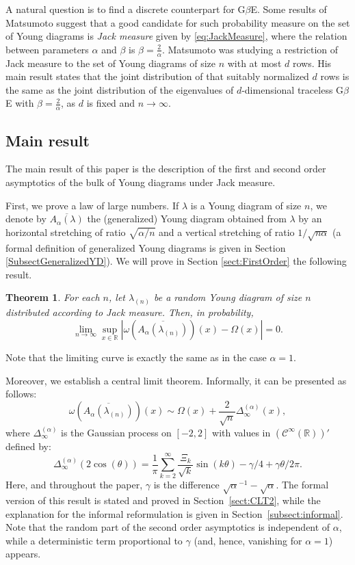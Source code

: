\documentclass[11pt]{amsart}
\theoremstyle{plain}
\newtheorem{theorem}[lemma]{Theorem}
\theoremstyle{remark}
\newcommand{\RR}{\mathbb{R}}
\begin{document}
A natural question is to find a discrete counterpart for G$\beta$E.
Some results of Matsumoto \cite{MatsumotoJackPlancherelFewRows} suggest that
a good candidate for such probability measure on the set of Young diagrams is \emph{Jack measure} given by \eqref{eq:JackMeasure},
where the relation between parameters $\alpha$ and $\beta$ is $\beta = \frac{2}{\alpha}$.
 Matsumoto was studying a restriction of Jack measure to the set of Young diagrams of size $n$ with at most $d$ rows.
 His main result states that the joint distribution of that suitably normalized $d$ rows 
 is the same as the joint distribution of the eigenvalues of $d$-dimensional traceless G$\beta$E with $\beta = \frac{2}{\alpha}$, 
 as $d$ is fixed and $n \to \infty$.

\subsection{Main result}

The main result of this paper is the description of the first and second order asymptotics
of the bulk of Young diagrams under Jack measure.

First, we prove a law of large numbers.
If $\lambda$ is a Young diagram of size $n$, we denote by $\overline{A_\alpha(\lambda)}$ 
the (generalized) Young diagram obtained from $\lambda$ by an horizontal stretching of ratio $\sqrt{\alpha/n}$
and a vertical stretching of ratio $1/\sqrt{n\alpha}$
(a formal definition of generalized Young diagrams is given in Section \ref{SubsectGeneralizedYD}).
We will prove in Section \ref{sect:FirstOrder} the following result.
\begin{theorem}
\label{theo:RYD-limit}
For each $n$, let $\lambda_{(n)}$ be a random Young diagram of size $n$
 distributed according to Jack measure. Then, in probability,
 \[ \lim_{n \to \infty} \sup\limits_{x\in \RR} \left| \omega\left(\overline{A_\alpha(\lambda_{(n)})}\right)(x)
 - \Omega(x) \right|  = 0.\]
\end{theorem}
Note that the limiting curve is exactly the same as in the case $\alpha=1$.

Moreover, we establish a central limit theorem.
Informally, it can be presented as follows:
\begin{equation}\label{eq:informal}
    \omega\left(\overline{A_\alpha(\lambda_{(n)})}\right)(x) \sim \Omega(x) +\frac{2}{\sqrt{n}} \Delta^{(\alpha)}_{\infty}(x),
\end{equation}
where $\Delta^{(\alpha)}_{\infty}$ is the Gaussian process on $[-2,2]$ with values in  $(\mathcal{C}^\infty(\RR))'$ defined by:
\[
\Delta_\infty^{(\alpha)} (2 \cos(\theta) )=
 \frac{1}{\pi} \sum_{k=2}^\infty \frac{\Xi_k}{\sqrt{k}} \sin(k \theta) - \gamma/4 +\gamma \theta/2\pi.
\]
Here, and throughout the paper, $\gamma$ is the difference $\sqrt{\alpha}^{-1}-\sqrt{\alpha}$.
The formal version of this result is stated and proved in Section~\ref{sect:CLT2},
while the explanation for the informal reformulation is given in Section~\ref{subsect:informal}.
Note that the random part of the second order asymptotics is independent of $\alpha$,
while a deterministic term proportional to $\gamma$
(and, hence, vanishing for $\alpha=1$) appears.
\end{document}
